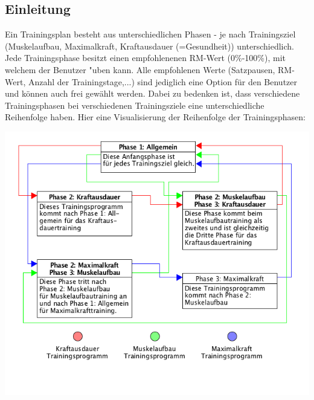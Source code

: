 \documentclass[FIPLY_base.tex]{subfiles}
\begin{document}
	\subsection{Einleitung}
	Ein Trainingsplan besteht aus unterschiedlichen Phasen - je nach Trainingsziel (Muskelaufbau, Maximalkraft, Kraftausdauer (=Gesundheit)) unterschiedlich. Jede Trainingsphase besitzt einen empfohlenenen RM-Wert (0\%-100\%), mit welchem der Benutzer "uben kann. Alle empfohlenen Werte (Satzpausen, RM-Wert, Anzahl der Trainingstage,...) sind jediglich eine Option für den Benutzer und können auch frei gewählt werden.
	Dabei zu bedenken ist, dass verschiedene Trainingsphasen bei verschiedenen Trainingsziele eine unterschiedliche Reihenfolge haben.
	Hier eine Visualisierung der Reihenfolge der Trainingsphasen:
	\begin{center}
		\includegraphics[scale=0.4]{img/VisualisierungTrainingsplan}
	\end{center}
	
	\newpage
\end{document}
